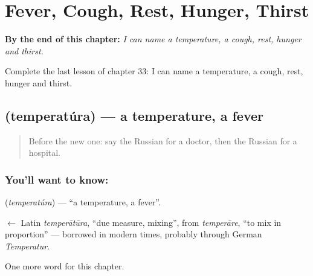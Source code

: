 
\chapter{Fever, Cough, Rest, Hunger, Thirst}
\label{ch:ru-fever-cough-rest-hunger-thirst}

\begin{chapteropening}
\textbf{By the end of this chapter:} \emph{I can name a temperature, a cough, rest, hunger and thirst.}

Complete the last lesson of chapter 33: I can name a temperature, a cough, rest, hunger and thirst.
\end{chapteropening}

\section[\texorpdfstring{\ru{температура} (temperatúra)}{температура (temperatúra)}]{ (temperatúra) — a temperature, a fever}

\label{lesson:RU-C33-temperature}



\begin{quote}
Before the new one: say the Russian for a doctor, then the Russian for a hospital.
\end{quote}

\subsection*{You'll want to know: }
\textbf{} (\emph{temperatúra}) — \textquotedblleft{}a temperature, a fever\textquotedblright{}.

\begin{cousinweb}
\textbf{} $\leftarrow$ Latin \emph{temperātūra}, \textquotedblleft{}due measure, mixing\textquotedblright{}, from \emph{temperāre}, \textquotedblleft{}to mix in proportion\textquotedblright{} — borrowed in modern times, probably through German \emph{Temperatur}.
\end{cousinweb}

\begin{grammarlens}[title={What you've built}]
One more word for this chapter.
\end{grammarlens}

